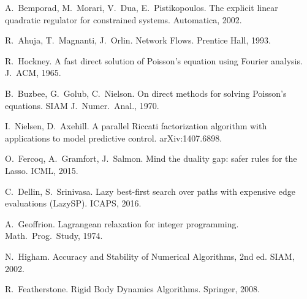 \documentclass[11pt]{article}
\theoremstyle{plain}
\theoremstyle{definition}
\theoremstyle{remark}
\begin{document}
\begin{enumerate}[label={[\arabic*]},leftmargin=2em,itemsep=0pt]
  \item A.~Bemporad, M.~Morari, V.~Dua, E.~Pistikopoulos. The explicit linear quadratic regulator for constrained systems. Automatica, 2002.
  \item R.~Ahuja, T.~Magnanti, J.~Orlin. Network Flows. Prentice Hall, 1993.
  \item R.~Hockney. A fast direct solution of Poisson's equation using Fourier analysis. J.~ACM, 1965.
  \item B.~Buzbee, G.~Golub, C.~Nielson. On direct methods for solving Poisson's equations. SIAM J.\ Numer.\ Anal., 1970.
  \item I.~Nielsen, D.~Axehill. A parallel Riccati factorization algorithm with applications to model predictive control. arXiv:1407.6898.
  \item O.~Fercoq, A.~Gramfort, J.~Salmon. Mind the duality gap: safer rules for the Lasso. ICML, 2015.
  \item C.~Dellin, S.~Srinivasa. Lazy best-first search over paths with expensive edge evaluations (LazySP). ICAPS, 2016.
  \item A.~Geoffrion. Lagrangean relaxation for integer programming. Math.\ Prog.\ Study, 1974.
  \item N.~Higham. Accuracy and Stability of Numerical Algorithms, 2nd ed. SIAM, 2002.
  \item R.~Featherstone. Rigid Body Dynamics Algorithms. Springer, 2008.
\end{enumerate}
\end{document}
